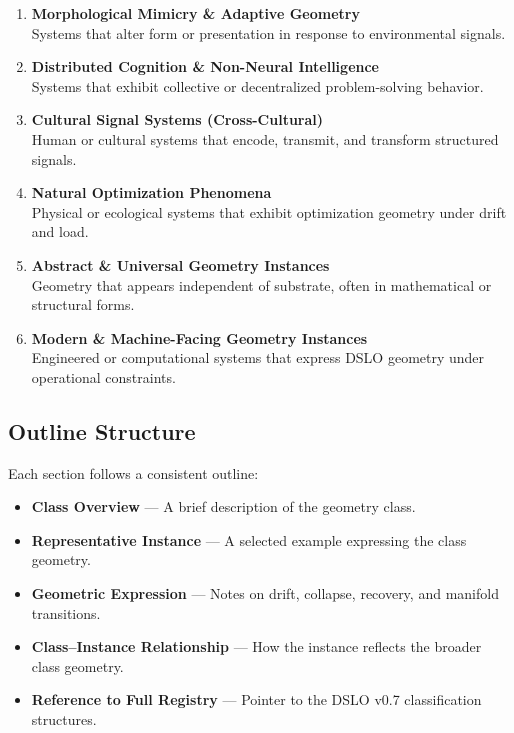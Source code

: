 \begin{enumerate}
    \item \textbf{Morphological Mimicry \& Adaptive Geometry} \\
    Systems that alter form or presentation in response to environmental signals.

    \item \textbf{Distributed Cognition \& Non-Neural Intelligence} \\
    Systems that exhibit collective or decentralized problem-solving behavior.

    \item \textbf{Cultural Signal Systems (Cross-Cultural)} \\
    Human or cultural systems that encode, transmit, and transform structured signals.

    \item \textbf{Natural Optimization Phenomena} \\
    Physical or ecological systems that exhibit optimization geometry under drift and load.

    \item \textbf{Abstract \& Universal Geometry Instances} \\
    Geometry that appears independent of substrate, often in mathematical or structural forms.

    \item \textbf{Modern \& Machine-Facing Geometry Instances} \\
    Engineered or computational systems that express DSLO geometry under operational constraints.
\end{enumerate}

\subsection{Outline Structure}
Each section follows a consistent outline:

\begin{itemize}
    \item \textbf{Class Overview} --- A brief description of the geometry class.
    \item \textbf{Representative Instance} --- A selected example expressing the class geometry.
    \item \textbf{Geometric Expression} --- Notes on drift, collapse, recovery, and manifold transitions.
    \item \textbf{Class--Instance Relationship} --- How the instance reflects the broader class geometry.
    \item \textbf{Reference to Full Registry} --- Pointer to the DSLO v0.7 classification structures.
\end{itemize}


